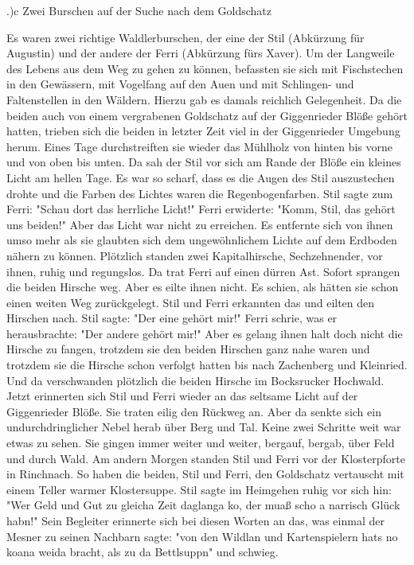 .)c Zwei Burschen auf der Suche nach dem Goldschatz

Es waren zwei richtige Waldlerburschen, der eine der Stil (Abkürzung für
Augustin) und der andere der Ferri (Abkürzung fürs Xaver). Um der Langweile des
Lebens aus dem Weg zu gehen zu können, befassten sie sich mit Fischstechen in
den Gewässern, mit Vogelfang auf den Auen und mit Schlingen- und Faltenstellen
in den Wäldern. Hierzu gab es damals reichlich Gelegenheit. Da die beiden auch
von einem vergrabenen Goldschatz auf der Giggenrieder Blöße gehört hatten,
trieben sich die beiden in letzter Zeit viel in der Giggenrieder Umgebung herum.
Eines Tage durchstreiften sie wieder das Mühlholz von hinten bis vorne und von
oben bis unten. Da sah der Stil vor sich am Rande der Blöße ein kleines Licht am
hellen Tage. Es war so scharf, dass es die Augen des Stil auszustechen drohte
und die Farben des Lichtes waren die Regenbogenfarben. Stil sagte zum Ferri:
"Schau dort das herrliche Licht!" Ferri erwiderte: "Komm, Stil, das gehört uns
beiden!" Aber das Licht war nicht zu erreichen. Es entfernte sich von ihnen umso
mehr als sie glaubten sich dem ungewöhnlichem Lichte auf dem Erdboden nähern zu
können. Plötzlich standen zwei Kapitalhirsche, Sechzehnender, vor ihnen, ruhig
und regungslos. Da trat Ferri auf einen dürren Ast. Sofort sprangen die beiden
Hirsche weg. Aber es eilte ihnen nicht. Es schien, als hätten sie schon einen
weiten Weg zurückgelegt. Stil und Ferri erkannten das und eilten den Hirschen
nach. Stil sagte: "Der eine gehört mir!" Ferri schrie, was er herausbrachte:
"Der andere gehört mir!" Aber es gelang ihnen halt doch nicht die Hirsche zu
fangen, trotzdem sie den beiden Hirschen ganz nahe waren und trotzdem sie die
Hirsche schon verfolgt hatten bis nach Zachenberg und Kleinried. Und da
verschwanden plötzlich die beiden Hirsche im Bocksrucker Hochwald. Jetzt
erinnerten sich Stil und Ferri wieder an das seltsame Licht auf der Giggenrieder
Blöße. Sie traten eilig den Rückweg an. Aber da senkte sich ein
undurchdringlicher Nebel herab über Berg und Tal. Keine zwei Schritte weit war
etwas zu sehen. Sie gingen immer weiter und weiter, bergauf, bergab, über Feld
und durch Wald. Am andern Morgen standen Stil und Ferri vor der Klosterpforte in
Rinchnach. So haben die beiden, Stil und Ferri, den Goldschatz vertauscht mit
einem Teller warmer Klostersuppe. Stil sagte im Heimgehen ruhig vor sich hin:
"Wer Geld und Gut zu gleicha Zeit daglanga ko, der muaß scho a narrisch Glück
habn!" Sein Begleiter erinnerte sich bei diesen Worten an das, was einmal der
Mesner zu seinen Nachbarn sagte: "von den Wildlan und Kartenspielern hats no
koana weida bracht, als zu da Bettlsuppn" und schwieg.

